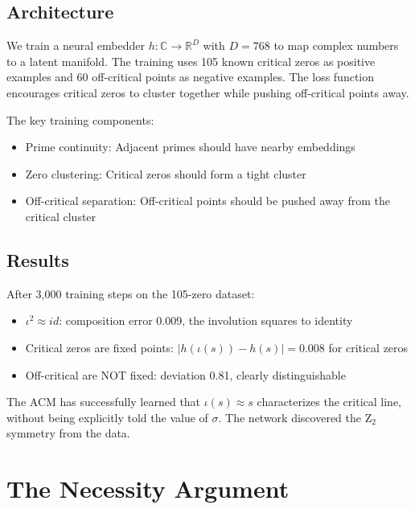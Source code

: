\documentclass[11pt]{article}
\begin{document}
\subsection{Architecture}

We train a neural embedder $h: \mathbb{C} \to \mathbb{R}^D$ with $D=768$ to map complex numbers to a latent manifold. The training uses 105 known critical zeros as positive examples and 60 off-critical points as negative examples. The loss function encourages critical zeros to cluster together while pushing off-critical points away.

The key training components:
\begin{itemize}[nosep]
\item Prime continuity: Adjacent primes should have nearby embeddings
\item Zero clustering: Critical zeros should form a tight cluster
\item Off-critical separation: Off-critical points should be pushed away from the critical cluster
\end{itemize}

\subsection{Results}

After 3,000 training steps on the 105-zero dataset:

\begin{itemize}[nosep]
\item $\iota^2 \approx id$: composition error 0.009, the involution squares to identity
\item Critical zeros are fixed points: $|h(\iota(s)) - h(s)| = 0.008$ for critical zeros
\item Off-critical are NOT fixed: deviation 0.81, clearly distinguishable
\end{itemize}

The ACM has successfully learned that $\iota(s) \approx s$ characterizes the critical line, without being explicitly told the value of $\sigma$. The network discovered the Z$_2$ symmetry from the data.

\section{The Necessity Argument}\label{sec:necessity}
\end{document}
